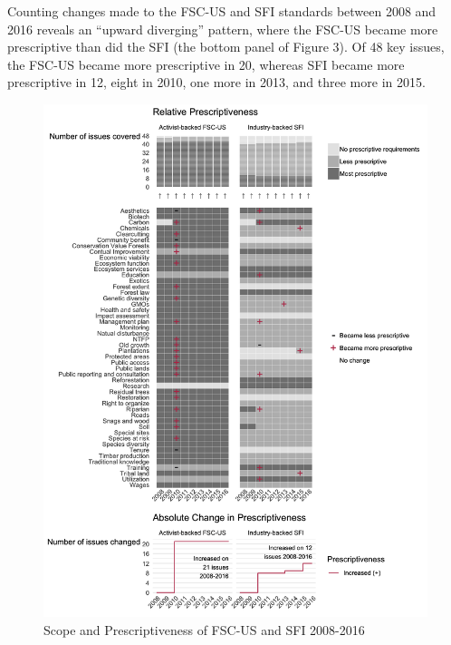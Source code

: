 \documentclass[
      12pt,
            Review ]{article}
\begin{document}
Counting changes made to the FSC-US and SFI standards between 2008 and
2016 reveals an ``upward diverging'' pattern, where the FSC-US became
more prescriptive than did the SFI (the bottom panel of Figure 3). Of 48
key issues, the FSC-US became more prescriptive in 20, whereas SFI
became more prescriptive in 12, eight in 2010, one more in 2013, and
three more in 2015.

\begin{figure}
\centering
\includegraphics{Figs/FSC-SFI-1.png}
\caption{Scope and Prescriptiveness of FSC-US and SFI 2008-2016}
\end{figure}
\end{document}
